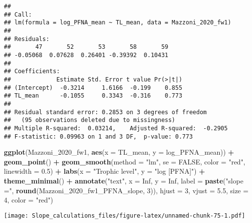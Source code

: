 \documentclass[
]{article}
\newenvironment{Shaded}{\begin{snugshade}}{\end{snugshade}}
\newcommand{\AttributeTok}[1]{\textcolor[rgb]{0.13,0.29,0.53}{#1}}
\newcommand{\ConstantTok}[1]{\textcolor[rgb]{0.56,0.35,0.01}{#1}}
\newcommand{\DecValTok}[1]{\textcolor[rgb]{0.00,0.00,0.81}{#1}}
\newcommand{\FloatTok}[1]{\textcolor[rgb]{0.00,0.00,0.81}{#1}}
\newcommand{\FunctionTok}[1]{\textcolor[rgb]{0.13,0.29,0.53}{\textbf{#1}}}
\newcommand{\NormalTok}[1]{#1}
\newcommand{\SpecialCharTok}[1]{\textcolor[rgb]{0.81,0.36,0.00}{\textbf{#1}}}
\newcommand{\StringTok}[1]{\textcolor[rgb]{0.31,0.60,0.02}{#1}}
\begin{document}
\begin{verbatim}
## 
## Call:
## lm(formula = log_PFNA_mean ~ TL_mean, data = Mazzoni_2020_fw1)
## 
## Residuals:
##       47       52       53       58       59 
## -0.05068  0.07628  0.26401 -0.39392  0.10431 
## 
## Coefficients:
##             Estimate Std. Error t value Pr(>|t|)
## (Intercept)  -0.3214     1.6166  -0.199    0.855
## TL_mean      -0.1055     0.3343  -0.316    0.773
## 
## Residual standard error: 0.2853 on 3 degrees of freedom
##   (95 observations deleted due to missingness)
## Multiple R-squared:  0.03214,    Adjusted R-squared:  -0.2905 
## F-statistic: 0.09963 on 1 and 3 DF,  p-value: 0.773
\end{verbatim}

\begin{Shaded}
\begin{Highlighting}[]
\FunctionTok{ggplot}\NormalTok{(Mazzoni\_2020\_fw1, }\FunctionTok{aes}\NormalTok{(}\AttributeTok{x =}\NormalTok{ TL\_mean, }\AttributeTok{y =}\NormalTok{ log\_PFNA\_mean)) }\SpecialCharTok{+}
  \FunctionTok{geom\_point}\NormalTok{() }\SpecialCharTok{+}
  \FunctionTok{geom\_smooth}\NormalTok{(}\AttributeTok{method =} \StringTok{"lm"}\NormalTok{, }\AttributeTok{se =} \ConstantTok{FALSE}\NormalTok{, }\AttributeTok{color =} \StringTok{"red"}\NormalTok{, }\AttributeTok{linewidth =} \FloatTok{0.5}\NormalTok{) }\SpecialCharTok{+}
  \FunctionTok{labs}\NormalTok{(}\AttributeTok{x =} \StringTok{"Trophic level"}\NormalTok{,}
       \AttributeTok{y =} \StringTok{"log [PFNA]"}\NormalTok{) }\SpecialCharTok{+}
  \FunctionTok{theme\_minimal}\NormalTok{() }\SpecialCharTok{+}
  \FunctionTok{annotate}\NormalTok{(}\StringTok{"text"}\NormalTok{, }\AttributeTok{x =} \ConstantTok{Inf}\NormalTok{, }\AttributeTok{y =} \ConstantTok{Inf}\NormalTok{, }\AttributeTok{label =} \FunctionTok{paste}\NormalTok{(}\StringTok{"slope ="}\NormalTok{, }\FunctionTok{round}\NormalTok{(Mazzoni\_2020\_fw1\_PFNA\_slope, }\DecValTok{3}\NormalTok{)), }
           \AttributeTok{hjust =} \DecValTok{3}\NormalTok{, }\AttributeTok{vjust =} \FloatTok{5.5}\NormalTok{, }\AttributeTok{size =} \DecValTok{4}\NormalTok{, }\AttributeTok{color =} \StringTok{"red"}\NormalTok{)}
\end{Highlighting}
\end{Shaded}

\texttt{[image: Slope\_calculations\_files/figure-latex/unnamed-chunk-75-1.pdf]}
\end{document}
